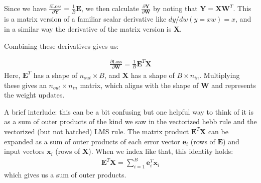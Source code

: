Since we have $\frac{\partial \text{Loss}}{\partial \mathbf{Y}} = \frac{1}{B} \mathbf{E}$, we then calculate $\frac{\partial \mathbf{Y}}{\partial \mathbf{W}}$ by noting that $\mathbf{Y} = \mathbf{X} \mathbf{W}^T$. This is a matrix version of a familiar scalar derivative like $dy/dw(y = xw) = x$, and in a similar way the derivative of the matrix version is $\mathbf{X}$. 

Combining these derivatives gives us:

\begin{eqnarray}
\frac{\partial \text{Loss}}{\partial \mathbf{W}} = \frac{1}{B} \mathbf{E}^T \mathbf{X}
\end{eqnarray}
Here, $\mathbf{E}^T$ has a shape of $n_{out} \times B$, and $\mathbf{X}$ has a shape of $B \times n_{in}$. Multiplying these gives an $n_{out} \times n_{in}$ matrix, which aligns with the shape of $\mathbf{W}$ and represents the weight updates.

A brief interlude: this can be a bit confusing but one helpful way to think of it is as a sum of outer products of the kind we saw in the vectorized hebb rule and the vectorized (but not batched) LMS rule. The matrix product $\mathbf{E}^T \mathbf{X}$ can be expanded as a sum of outer products of each error vector $\mathbf{e}_i$ (rows of $\mathbf{E}$) and input vectors $\mathbf{x}_i$ (rows of $\mathbf{X}$). When we index like that, this identity holds:
\begin{eqnarray}
\mathbf{E}^T \mathbf{X} = \sum_{i=1}^{B} \mathbf{e}_i^T \mathbf{x}_i
\end{eqnarray}
which gives us a sum of outer products.

